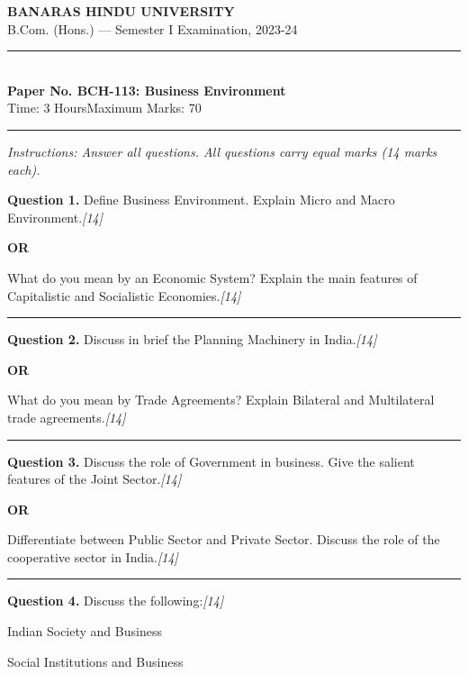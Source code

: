 \documentclass[11pt,a4paper]{article}
\newcommand{\pts}[1]{\hfill   \textit{[#1]}}
\begin{document}
\begin{center}
  {\large\bfseries BANARAS HINDU UNIVERSITY}\\[2pt]
  {\normalsize B.Com. (Hons.) --- Semester I Examination, 2023-24}\\[6pt]
  \rule{0.8\linewidth}{0.5pt}\\[6pt]
  {\large\bfseries Paper No. BCH-113: Business Environment}\\[4pt]
  {\normalsize Time: 3 Hours\hfill Maximum Marks: 70}
\end{center}

\rule{\linewidth}{0.4pt}

\smallskip



\noindent   \textit{Instructions: Answer all questions. All questions carry equal marks (14 marks each).}

\bigskip




\noindent   \textbf{Question 1.}
Define Business Environment. Explain Micro and Macro Environment.\pts{14}

\centerline{   \textbf{OR}}

What do you mean by an Economic System? Explain the main features of Capitalistic and Socialistic Economies.\pts{14}

\medskip\rule{\linewidth}{0.2pt}




\noindent   \textbf{Question 2.}
Discuss in brief the Planning Machinery in India.\pts{14}

\centerline{   \textbf{OR}}

What do you mean by Trade Agreements? Explain Bilateral and Multilateral trade agreements.\pts{14}

\medskip\rule{\linewidth}{0.2pt}




\noindent   \textbf{Question 3.}
Discuss the role of Government in business. Give the salient features of the Joint Sector.\pts{14}

\centerline{   \textbf{OR}}

Differentiate between Public Sector and Private Sector. Discuss the role of the cooperative sector in India.\pts{14}

\medskip\rule{\linewidth}{0.2pt}




\noindent   \textbf{Question 4.}
Discuss the following:\pts{14}

\begin{parts}
  \item Indian Society and Business
  \item Social Institutions and Business
\end{parts}
\end{document}
